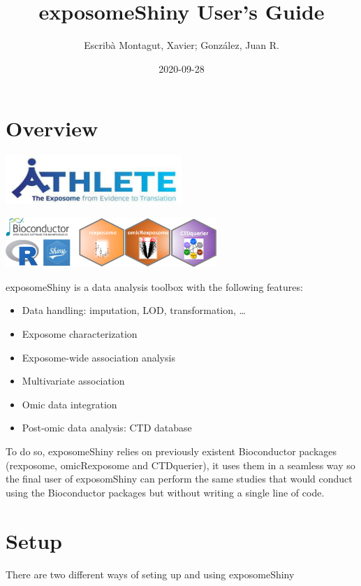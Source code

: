 \documentclass[
]{book}
\title{exposomeShiny User's Guide}
\author{Escribà Montagut, Xavier; González, Juan R.}
\date{2020-09-28}
\providecommand{\tightlist}{%
  \setlength{\itemsep}{0pt}\setlength{\parskip}{0pt}}
\begin{document}
\maketitle

{
\setcounter{tocdepth}{1}
\tableofcontents
}
\hypertarget{overview}{%
\chapter{Overview}\label{overview}}

\includegraphics[width=0.5\textwidth,height=\textheight]{images/athlete.png}

\includegraphics[width=0.6\textwidth,height=\textheight]{images/logo.png}

exposomeShiny is a data analysis toolbox with the following features:

\begin{itemize}
\tightlist
\item
  Data handling: imputation, LOD, transformation, \ldots{}
\item
  Exposome characterization
\item
  Exposome-wide association analysis
\item
  Multivariate association
\item
  Omic data integration
\item
  Post-omic data analysis: CTD database
\end{itemize}

To do so, exposomeShiny relies on previously existent Bioconductor packages (rexposome, omicRexposome and CTDquerier), it uses them in a seamless way so the final user of exposomShiny can perform the same studies that would conduct using the Bioconductor packages but without writing a single line of code.

\hypertarget{setup}{%
\chapter{Setup}\label{setup}}

There are two different ways of seting up and using exposomeShiny
\end{document}
